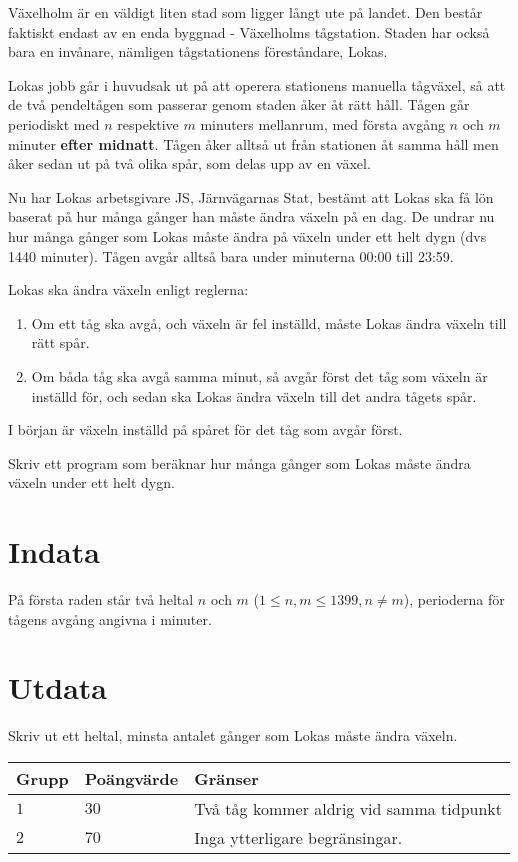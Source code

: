 Växelholm är en väldigt liten stad som ligger långt ute på landet. Den består faktiskt endast av
en enda byggnad - Växelholms tågstation. Staden har också bara en invånare, nämligen tågstationens
föreståndare, Lokas. 

Lokas jobb går i huvudsak ut på att operera stationens manuella tågväxel, så att de två pendeltågen
som passerar genom staden åker åt rätt håll. Tågen går periodiskt med $n$ respektive $m$ minuters
mellanrum, med första avgång $n$ och $m$ minuter \textbf{efter midnatt}. Tågen åker alltså ut från stationen
åt samma håll men åker sedan ut på två olika spår, som delas upp av en växel.

Nu har Lokas arbetsgivare JS, Järnvägarnas Stat, bestämt att Lokas ska få lön baserat på hur många
gånger han måste ändra växeln på en dag. De undrar nu hur många gånger som Lokas måste ändra på växeln
under ett helt dygn (dvs 1440 minuter). Tågen avgår alltså bara under minuterna 00:00 till 23:59. 

Lokas ska ändra växeln enligt reglerna:
\begin{enumerate}
\item Om ett tåg ska avgå, och växeln är fel inställd, måste Lokas ändra växeln till rätt spår.
\item Om båda tåg ska avgå samma minut, så avgår först det tåg som växeln är inställd för, och sedan ska Lokas ändra växeln till det andra tågets spår.
\end{enumerate}

I början är växeln inställd på spåret för det tåg som avgår först. 

Skriv ett program som beräknar hur många gånger som Lokas måste ändra växeln under ett helt dygn.

\section*{Indata}
På första raden står två heltal $n$ och $m$ ($1 \leq n, m \leq 1399, n \not= m$), perioderna för tågens avgång angivna i minuter.

\section*{Utdata}
Skriv ut ett heltal, minsta antalet gånger som Lokas måste ändra växeln.

\noindent
\begin{tabular}{| l | l | p{12cm} |}
  \hline
  Grupp & Poängvärde & Gränser \\ \hline
  $1$    & $30$        & Två tåg kommer aldrig vid samma tidpunkt \\ \hline 
  $2$    & $70$        & Inga ytterligare begränsingar. \\ \hline 
\end{tabular}
